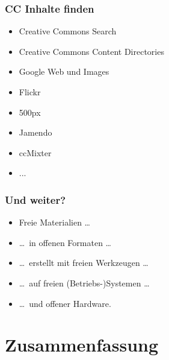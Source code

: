 \documentclass{beamer}
\begin{document}
\begin{frame}
    \frametitle{CC Inhalte finden}
    \begin{itemize}
        \item<2-> Creative Commons Search
        \item<3-> Creative Commons Content Directories
        \item<4-> Google Web und Images
        \item<5-> Flickr
        \item<6-> 500px
        \item<7-> Jamendo
        \item<8-> ccMixter
        \item<9-> ...
    \end{itemize}
\end{frame}

\begin{frame}
    \frametitle{Und weiter?}
    \begin{itemize}
      \item<2-> Freie Materialien \dots
      \item<3-> \dots~in offenen Formaten \dots
      \item<4-> \dots~erstellt mit freien Werkzeugen \dots
      \item<5-> \dots~auf freien (Betriebs-)Systemen \dots
      \item<6-> \dots~und offener Hardware.
    \end{itemize}
\end{frame}

\section{Zusammenfassung}
\subsection{}
\end{document}
